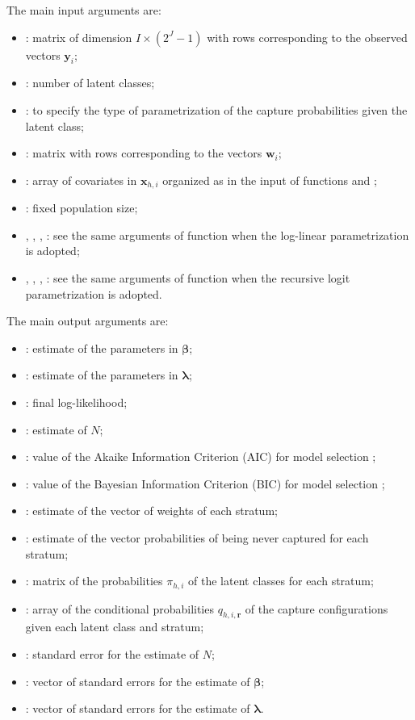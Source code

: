 The main input arguments are:
%
\begin{itemize}
%
\item {}: matrix of dimension $I\times (2^J-1)$ with rows corresponding to the observed vectors $\bm{y}_i$;
%
\item {}: number of latent classes;
%
\item {}: to specify the type of parametrization of the capture probabilities given the latent class;
%
\item {}: matrix with rows corresponding to the vectors $\bm{w}_i$;
%
\item {}: array of covariates in $\bm{x}_{h,i}$ organized as in the input of functions  and ;
%
\item {}: fixed population size;
%
\item {}, , , : see the same arguments of function  when the log-linear parametrization is adopted;
%
\item {}, , , : see the same arguments of function  when the recursive logit parametrization is adopted.
%
\end{itemize}
%
The main output arguments are:
%
\begin{itemize}
%
\item {}: estimate of the parameters in $\bm{\beta}$;
%
\item {}: estimate of the parameters in $\bm{\lambda}$;
%
\item {}: final log-likelihood;
%
\item {}: estimate of $N$;
%
\item {}: value of the Akaike Information Criterion (AIC) for model selection \cite{aka:73};
%
\item {}: value of the Bayesian Information Criterion (BIC) for model selection \cite{schw:78};
%
\item {}: estimate of the vector of weights of each stratum;
%
\item {}: estimate of the vector probabilities of being never captured for each stratum;
%
\item {}: matrix of the probabilities $\pi_{h,i}$ of the latent classes for each stratum;
%
\item {}: array of the conditional probabilities $q_{h,i,\bm{r}}$ of the capture configurations given each latent class and stratum;
%
\item {}: standard error for the estimate of $N$;
%
\item {}: vector of standard errors for the estimate of $\bm{\beta}$;
%
\item {}: vector of standard errors for the estimate of $\bm{\lambda}$.
%
\end{itemize}
%
